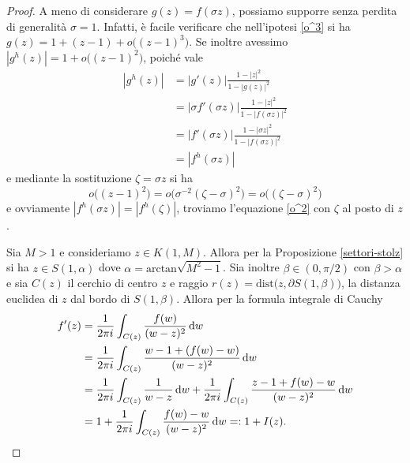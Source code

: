 \begin{proof}
  A meno di considerare $g(z)=f(\sigma z)$, possiamo supporre senza perdita di generalità $\sigma=1$. Infatti, è facile verificare che nell'ipotesi \eqref{o^3} si ha $g(z)=1+(z-1)+o\bigl((z-1)^3\bigr)$. Se inoltre avessimo $|g^h(z)|=1+o\bigl((z-1)^2\bigr)$, poiché vale
  \begin{align*}
    |g^h(z)| & =|g'(z)|\frac{1-|z|^2}{1-|g(z)|^2} \\
    & =|\sigma f'(\sigma z)|\frac{1-|z|^2}{1-|f(\sigma z)|^2} \\
    & =|f'(\sigma z)|\frac{1-|\sigma z|^2}{1-|f(\sigma z)|^2} \\
    & =|f^h(\sigma z)|
  \end{align*}
  e mediante la sostituzione $\zeta=\sigma z$ si ha
  $$o\bigl((z-1)^2\bigr)=o\bigl(\sigma^{-2}(\zeta-\sigma)^2\bigr)=o\bigl((\zeta-\sigma)^2\bigr)$$
  e ovviamente $|f^h(\sigma z)|=|f^h(\zeta)|$, troviamo l'equazione \eqref{o^2} con $\zeta$ al posto di $z$.

  Sia $M>1$ e consideriamo $z \in K(1,M)$. Allora per la Proposizione \ref{settori-stolz} si ha $z \in S(1,\alpha)$ dove $\alpha=\text{arctan}\sqrt{M^2-1}$.
  Sia inoltre $\beta \in (0,\pi/2)$ con $\beta>\alpha$ e sia $C(z)$ il cerchio di centro $z$ e raggio $r(z)=\text{dist}\bigl(z, \partial S(1,\beta)\bigr)$, la distanza euclidea di $z$ dal bordo di $S(1,\beta)$. Allora per la formula integrale di Cauchy
  \begin{align*}
    f'(z) & =\frac{1}{2\pi i} \int_{C(z)} \frac{f(w)}{(w-z)^2}\mathop{}\!\mathrm{d} w \\
    & =\frac{1}{2\pi i} \int_{C(z)} \frac{w-1+(f(w)-w)}{(w-z)^2}\mathop{}\!\mathrm{d} w \\
    & =\frac{1}{2\pi i} \int_{C(z)} \frac{1}{w-z}\mathop{}\!\mathrm{d} w+\frac{1}{2\pi i} \int_{C(z)} \frac{z-1+f(w)-w}{(w-z)^2}\mathop{}\!\mathrm{d} w \\
    & =1+\frac{1}{2\pi i} \int_{C(z)} \frac{f(w)-w}{(w-z)^2}\mathop{}\!\mathrm{d} w=:1+I(z).
  \end{align*}


\end{proof}
